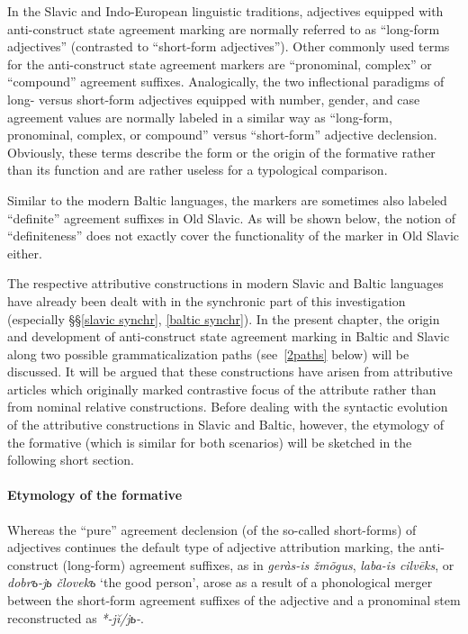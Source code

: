In the Slavic and Indo-European linguistic traditions, adjectives equipped with anti\hyp{}construct state agreement marking are normally referred to as “long-form adjectives” (contrasted to “short-form adjectives”). Other commonly used terms for the anti\hyp{}construct state agreement markers are “pronominal, complex” or “compound” agreement suffixes. Analogically, the two inflectional paradigms of long- versus short-form adjectives equipped with number, gender, and case agreement values are normally labeled in a similar way as “long-form, pronominal, complex, or compound” versus “short-form” adjective declension. Obviously, these terms describe the form or the origin of the formative rather than its function and are rather useless for a typological comparison.

Similar to the modern Baltic languages, the markers are sometimes also labeled “definite” agreement suffixes in Old Slavic. As will be shown below, the notion of “definiteness” does not exactly cover the functionality of the marker in Old Slavic either.

The respective attributive constructions in modern Slavic and Baltic languages have already been dealt with in the synchronic part of this investigation (especially \S\S\ref{slavic synchr}, \ref{baltic synchr}). In the present chapter, the origin and development of anti\hyp{}construct state agreement marking in Baltic and Slavic along two possible grammaticalization paths (see~\ref{2paths} below) will be discussed. It will be argued that these constructions have arisen from attributive articles which originally marked contrastive focus of the attribute rather than from nominal relative constructions. Before dealing with the syntactic evolution of the attributive constructions in Slavic and Baltic, however, the etymology of the formative (which is similar for both scenarios) will be sketched in the following short section.

\paragraph{Etymology of the formative} 
Whereas the “pure” agreement declension (of the so-called short-forms) of adjectives continues the  default type of adjective attribution marking, the anti\hyp{}construct (long-form) agreement suffixes, as in  \textit{geràs-is žmõgus},  \textit{laba-is cilvēks}, or  \textit{dobrъ-jь človekъ} ‘the good person’, arose as a result of a phonological merger between the short-form agreement suffixes of the adjective and a pronominal stem reconstructed as  \textit{*-jĭ/jь-}.


